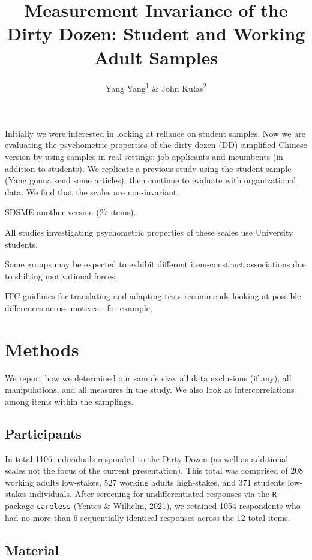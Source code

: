 \documentclass[
  english,
  man]{apa6}
\title{Measurement Invariance of the Dirty Dozen: Student and Working Adult Samples}
\author{Yang Yang\textsuperscript{1} \& John Kulas\textsuperscript{2}}
\date{}
\affiliation{\vspace{0.5cm}\textsuperscript{1} Roche\\\textsuperscript{2} Montclair State University}
\begin{document}
\maketitle

Initially we were interested in looking at reliance on student samples. Now we are evaluating the psychometric properties of the dirty dozen (DD) simplified Chinese version by using samples in real settings: job applicants and incumbents (in addition to students). We replicate a previous study using the student sample (Yang gonna send some articles), then continue to evaluate with organizational data. We find that the scales are non-invariant.

SDSME another version (27 items).

All studies investigating psychometric properties of these scales use University students.

Some groups may be expected to exhibit different item-construct associations due to shifting motivational forces.

ITC guidlines for translating and adapting tests recommends looking at possible differences across motives - for example,

\hypertarget{methods}{%
\section{Methods}\label{methods}}

We report how we determined our sample size, all data exclusions (if any), all manipulations, and all measures in the study. We also look at intercorrelations among items within the samplings.

\hypertarget{participants}{%
\subsection{Participants}\label{participants}}

In total 1106 individuals responded to the Dirty Dozen (as well as additional scales not the focus of the current presentation). This total was comprised of 208 working adults low-stakes, 527 working adults high-stakes, and 371 students low-stakes individuals. After screening for undifferentiated responses via the \texttt{R} package \texttt{careless} (Yentes \& Wilhelm, 2021), we retained 1054 respondents who had no more than 6 sequentially identical responses across the 12 total items.

\hypertarget{material}{%
\subsection{Material}\label{material}}
\end{document}
